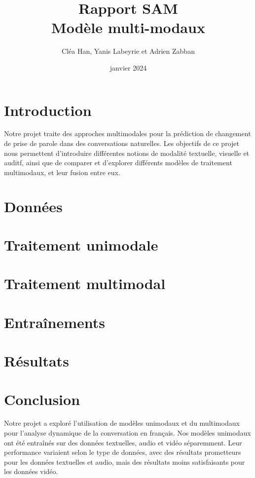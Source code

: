 \documentclass[a4paper]{article}
\title{Rapport SAM \\ Modèle multi-modaux}
\author{Cléa Han, Yanis Labeyrie et Adrien Zabban}
\date{janvier 2024}
\begin{document}
\maketitle

\section{Introduction}

Notre projet traite des approches multimodales pour la prédiction de changement de prise de parole dans des conversations naturelles. 
Les objectifs de ce projet nous permettent d'introduire différentes notions de modalité textuelle, visuelle et auditf, ainsi que de
comparer et d'explorer différents modèles de traitement multimodaux, et leur fusion entre eux.

\section{Données}


\section{Traitement unimodale}


\section{Traitement multimodal}


\section{Entraînements}


\section{Résultats}



\section{Conclusion}

Notre projet a exploré l'utilisation de modèles unimodaux et du multimodaux pour l'analyse dynamique de la conversation en français.
Nos modèles unimodaux ont été entraînés sur des données textuelles, audio et vidéo séparemment. Leur performance variaient selon le type de données, avec des résultats prometteurs pour les données textuelles et audio, mais des résultats moins satisfaisants pour les données vidéo.
\end{document}
